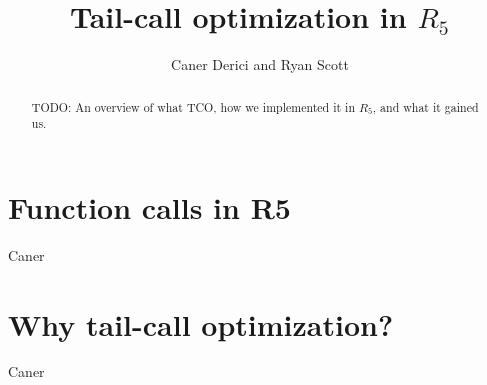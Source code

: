 \documentclass[12pt]{article}
\begin{document}
%
%
%
%
%
%
%
%

\title{Tail-call optimization in $R_5$\vspace{-2ex}}
\author{Caner Derici and Ryan Scott} 
 
\maketitle

\begin{abstract}
 TODO: An overview of what TCO, how we implemented it in $R_5$, and what it gained us.
\end{abstract}

\section{Function calls in R5}
Caner

\section{Why tail-call optimization?}
Caner
\end{document}
